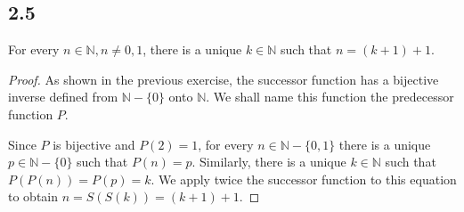 \subsection*{2.5} For every $n\in \mathbb{N}, n\neq0,1$, there is a unique $k \in \mathbb{N}$ such that $n = (k+1)+1$.

\begin{proof}
As shown in the previous exercise, the successor function has a bijective inverse defined from $\mathbb{N} - \{0\}$ onto $\mathbb{N}$. We shall name this function the predecessor function $P$.

Since $P$ is bijective and $P(2) = 1$, for every $n \in \mathbb{N} - \{0,1\}$ there is a unique $p \in \mathbb{N} - \{0\}$ such that $P(n) = p$. Similarly, there is a unique $k \in \mathbb{N}$ such that $P(P(n)) = P(p) = k$. We apply twice the successor function to this equation to obtain $n = S(S(k)) = (k+1)+1$.
\end{proof}

